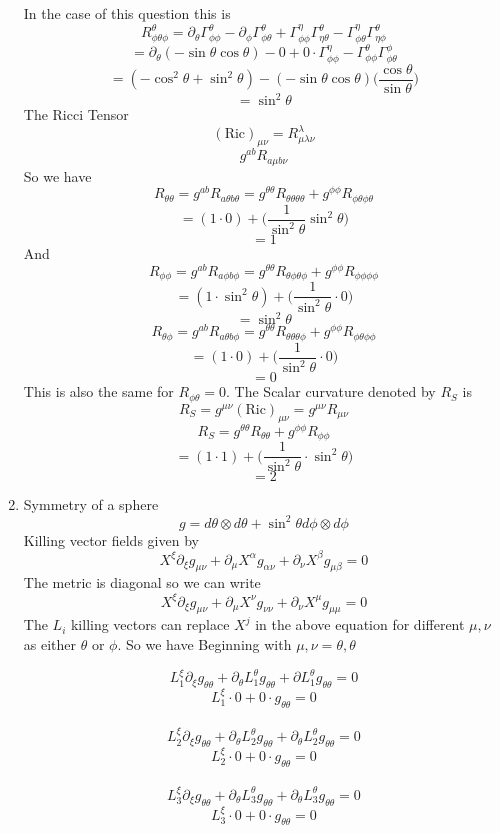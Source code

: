 \documentclass[12pt]{article}
\begin{document}
\begin{enumerate}
  In the case of this question this is 
  $$ R^{\theta}_{\phi \theta \phi} = \partial_{\theta} \Gamma^{\theta}_{\phi \phi} - \partial_{\phi} \Gamma^{\theta}_{\phi \theta} + \Gamma^{\eta}_{\phi \phi} \Gamma^{\theta}_{\eta \theta} - \Gamma^{\eta}_{\phi \theta} \Gamma^{\theta}_{\eta \phi} $$
  $$ = \partial_{\theta} (- \sin \theta \cos \theta ) - 0 + 0 \cdot \Gamma^{\eta}_{\phi \phi} - \Gamma^{\theta}_{\phi \phi} \Gamma^{\phi}_{\phi \theta} $$ 
  $$ = (- \cos^2 \theta + \sin^2 \theta ) - ( - \sin \theta \cos \theta ) \Big( \frac{\cos \theta}{\sin \theta} \Big) $$
  $$ = \sin^2 \theta $$
  The Ricci Tensor 
  $$ ( \textrm{Ric})_{\mu \nu} = R^{\lambda}_{\mu \lambda \nu} $$
  $$ g^{ab} R_{a \mu b \nu} $$
  So we have 
  $$ R_{\theta \theta} = g^{ab} R_{a \theta b \theta} = g^{\theta \theta} R_{\theta \theta \theta \theta} + g^{\phi \phi} R_{\phi \theta \phi \theta} $$
  $$ = (1 \cdot 0) + \Big( \frac{1}{\sin^2 \theta} \sin^2 \theta \Big) $$
  $$ = 1 $$
  And 
  $$ R_{\phi \phi} = g^{ab} R_{a \phi b \phi} = g^{\theta \theta} R_{\theta \phi \theta \phi} + g^{\phi \phi} R_{\phi \phi \phi \phi} $$
  $$ = (1 \cdot \sin^2 \theta ) + \Big( \frac{1}{\sin^2 \theta} \cdot 0 \Big) $$
  $$ = \sin^2 \theta $$
  $$ R_{\theta \phi} = g^{ab} R_{a \theta b \phi} = g^{\theta \theta} R_{\theta \theta \theta \phi} + g^{\phi \phi} R_{\phi \theta \phi \phi} $$
  $$ =( 1 \cdot 0) + \Big( \frac{1}{\sin^2 \theta }\cdot 0 \Big) $$
  $$ =0 $$
  This is also the same for $R_{\phi \theta} = 0$. The Scalar curvature denoted by $R_S$ is 
  $$ R_S = g^{\mu \nu} ( \textrm{Ric} )_{\mu \nu} = g^{\mu \nu} R_{\mu \nu} $$
  $$ R_S = g^{\theta \theta}R_{\theta \theta} + g^{\phi \phi} R_{\phi \phi} $$
  $$ = ( 1 \cdot 1) + \Big( \frac{1}{\sin^2 \theta} \cdot \sin^2 \theta \Big) $$
  $$ = 2 $$
  \item Symmetry of a sphere
  $$ g = d \theta \otimes d \theta + \sin^2 \theta d \phi \otimes d \phi $$
  Killing vector fields given by 
  $$ X^{\xi} \partial_{\xi} g_{\mu \nu} + \partial_{\mu} X^{\alpha} g_{\alpha \nu} + \partial_{\nu} X^{\beta} g_{\mu \beta} = 0 $$
  The metric is diagonal so we can write 
  $$ X^{\xi} \partial_{\xi} g_{\mu \nu} + \partial_{\mu} X^{\nu} g_{\nu \nu} + \partial_{\nu} X^{\mu} g_{\mu \mu} = 0 $$
  The $L_i$ killing vectors can replace $X^j$ in the above equation for different $\mu, \nu$ as either $\theta$ or $\phi$. So we have 
  Beginning with $ \mu, \nu = \theta, \theta$

  $$ L_1^{\xi} \partial_{\xi} g_{\theta \theta} + \partial_{\theta} L_1^{\theta} g_{\theta \theta} + \partial L_1^{\theta} g_{\theta \theta} = 0 $$
  $$ L_1^{\xi} \cdot 0 + 0 \cdot g_{\theta \theta} = 0 $$
  \\
  $$ L_2^{\xi} \partial_{\xi} g_{\theta \theta} + \partial_{\theta} L_2^{\theta} g_{\theta \theta} + \partial_{\theta} L_2^{\theta} g_{\theta \theta} = 0 $$
  $$ L_2^{\xi} \cdot 0 + 0 \cdot g_{\theta \theta} = 0 $$
  \\
  $$ L_3^{\xi} \partial_{\xi} g_{\theta \theta} + \partial_{\theta} L_3^{\theta} g_{\theta \theta} + \partial_{\theta} L_3^{\theta} g_{\theta \theta} = 0 $$
  $$ L_3^{\xi} \cdot 0 + 0 \cdot g_{\theta \theta} = 0 $$


\end{enumerate}
\end{document}
